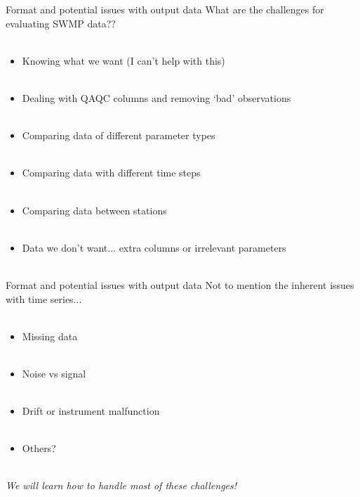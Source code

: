 \documentclass[xcolor=svgnames]{beamer}\usepackage[]{graphicx}\usepackage[]{color}
\begin{document}
\begin{frame}{Format and potential issues with output data}
\onslide<+->
What are the challenges for evaluating SWMP data?? \\~\\
\onslide<+->
\begin{itemize}
\item Knowing what we want (I can't help with this) \\~\\
\item Dealing with QAQC columns and removing `bad' observations \\~\\
\item Comparing data of different parameter types \\~\\
\item Comparing data with different time steps \\~\\
\item Comparing data between stations \\~\\
\item Data we don't want... extra columns or irrelevant parameters \\~\\
\end{itemize}
\end{frame}

\begin{frame}{Format and potential issues with output data}
\onslide<+->
Not to mention the inherent issues with time series... \\~\\
\begin{itemize}
\item Missing data \\~\\
\item Noise vs signal \\~\\
\item Drift or instrument malfunction \\~\\
\item Others?\\~\\
\end{itemize}
\onslide<+->
\centerline{\emph{We will learn how to handle most of these challenges!}}
\end{frame}
\end{document}
